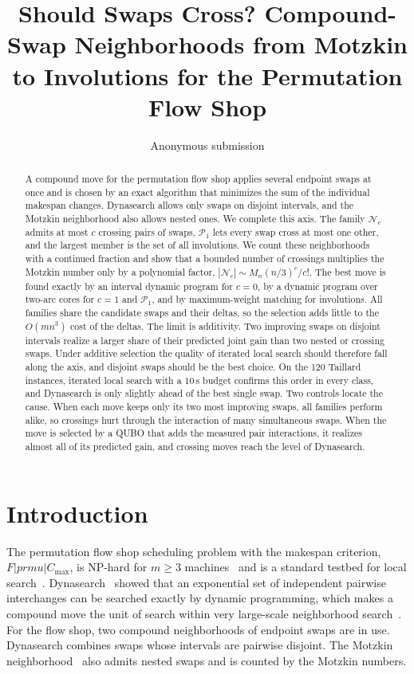 \documentclass[10pt,twocolumn]{article}
\title{Should Swaps Cross? Compound-Swap Neighborhoods from Motzkin\\
to Involutions for the Permutation Flow Shop}
\author{Anonymous submission}
\date{}
\newcommand{\N}{\mathcal{N}}
\newcommand{\Pa}{\mathcal{P}}
\begin{document}
\maketitle

\begin{abstract}
A compound move for the permutation flow shop applies several endpoint
swaps at once and is chosen by an exact algorithm that minimizes the sum
of the individual makespan changes. Dynasearch allows only swaps on
disjoint intervals, and the Motzkin neighborhood also allows nested
ones. We complete this axis. The family $\N_c$ admits at most $c$
crossing pairs of swaps, $\Pa_1$ lets every swap cross at most one
other, and the largest member is the set of all involutions. We count
these neighborhoods with a continued fraction and show that a bounded
number of crossings multiplies the Motzkin number only by a polynomial
factor, $|\N_c|\sim M_n (n/3)^c/c!$. The best move is found exactly by
an interval dynamic program for $c=0$, by a dynamic program over
two-arc cores for $c=1$ and $\Pa_1$, and by maximum-weight matching for
involutions. All families share the candidate swaps and their deltas, so
the selection adds little to the $O(mn^3)$ cost of the deltas. The limit
is additivity. Two improving swaps on disjoint intervals realize a
larger share of their predicted joint gain than two nested or crossing
swaps. Under additive selection the quality of iterated local search
should therefore fall along the axis, and disjoint swaps should be the
best choice. On the 120 Taillard instances, iterated local search with
a $10$\,s budget confirms this order in every class, and Dynasearch is
only slightly ahead of the best single swap. Two controls locate the
cause. When each move keeps only its two most improving swaps, all
families perform alike, so crossings hurt through the interaction of
many simultaneous swaps. When the move is selected by a QUBO that adds
the measured pair interactions, it realizes almost all of its predicted
gain, and crossing moves reach the level of Dynasearch.
\end{abstract}

\section{Introduction}

The permutation flow shop scheduling problem with the makespan
criterion, $F|prmu|C_{\max}$, is NP-hard for $m\geq 3$
machines~\cite{garey1976} and is a standard testbed for local
search~\cite{taillard1993,ruiz2007}. Dynasearch~\cite{congram2002}
showed that an exponential set of independent pairwise interchanges can
be searched exactly by dynamic programming, which makes a compound move
the unit of search within very large-scale neighborhood
search~\cite{ahuja2002}. For the flow shop, two compound neighborhoods
of endpoint swaps are in use. Dynasearch combines swaps whose intervals
are pairwise disjoint. The Motzkin neighborhood~\cite{motzkin_own} also
admits nested swaps and is counted by the Motzkin numbers.
\end{document}
